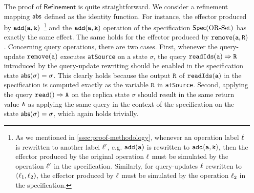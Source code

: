 The proof of $\mathsf{Refinement}$ is quite straightforward. We consider a refinement mapping $\mathsf{abs}$ defined as the identity function. For instance, the effector produced by $\alabelshort[{\tt add}]{a,k}$~\footnote{As we mentioned in \autoref{ssec:proof-methodology}, whenever an operation label $\ell$ is rewritten to another label $\ell'$, e.g. $\alabelshort[{\tt add}]{a}$ is rewritten to $\alabelshort[{\tt add}]{a,k}$, then the effector produced by the original operation $\ell$ must be simulated by the operation $\ell'$ in the specification. Similarly, for query-updates $\ell$ rewritten to $(\ell_1,\ell_2)$, the effector produced by $\ell$ must be simulated by the operation $\ell_2$ in the specification.} and the $\alabelshort[{\tt add}]{a,k}$ operation of the specification $\mathsf{Spec}(\text{OR\text{-}Set})$ has exactly the same effect. The same holds for the effector produced by $\alabelshort[{\tt remove}]{a,R}$. Concerning query operations, there are two cases. First, whenever the query-update $\alabelshort[{\tt remove}]{a}$ executes \lstinline|atSource| on a state $\sigma$, the query $\alabellong[{\tt readIds}]{a}{R}{}$ introduced by the query-update rewriting should be enabled in the specification state $\mathsf{abs}(\sigma)=\sigma$. This clearly holds because the output ${\tt R}$ of ${\tt readIds(a)}$ in the specification is computed exactly as the variable ${\tt R}$ in \lstinline|atSource|.
Second, applying the query $\alabellongind[{\tt read}]{}{A}{}$ on the replica state $\sigma$ should result in the same return value ${\tt A}$ as applying the same query in the context of the specification on the state $\mathsf{abs}(\sigma)=\sigma$, which again holds trivially.

